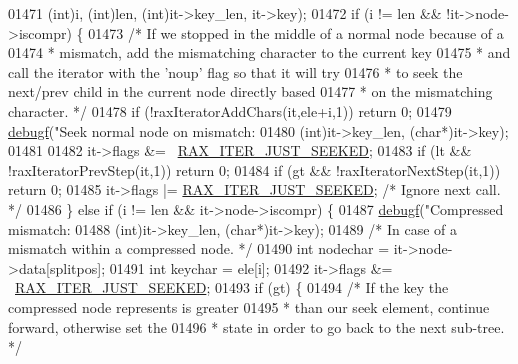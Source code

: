 \begin{DoxyCode}
{{{{{{{{{{{{{{{{{{{{{01471             (\textcolor{keywordtype}{int})i, (\textcolor{keywordtype}{int})len, (\textcolor{keywordtype}{int})it->key\_len, it->key);
01472         \textcolor{keywordflow}{if} (i != len && !it->node->iscompr) \{
01473             \textcolor{comment}{/* If we stopped in the middle of a normal node because of a}
01474 \textcolor{comment}{             * mismatch, add the mismatching character to the current key}
01475 \textcolor{comment}{             * and call the iterator with the 'noup' flag so that it will try}
01476 \textcolor{comment}{             * to seek the next/prev child in the current node directly based}
01477 \textcolor{comment}{             * on the mismatching character. */}
01478             \textcolor{keywordflow}{if} (!raxIteratorAddChars(it,ele+i,1)) \textcolor{keywordflow}{return} 0;
01479             \hyperlink{rax_8c_a10b215c81aa397dbc44adfb3e436befb}{debugf}(\textcolor{stringliteral}{"Seek normal node on mismatch: %
01480                 (\textcolor{keywordtype}{int})it->key\_len, (\textcolor{keywordtype}{char}*)it->key);
01481 
01482             it->flags &= ~\hyperlink{rax_8h_a665a029bbb4c6864ca2153b3ba3b746c}{RAX\_ITER\_JUST\_SEEKED};
01483             \textcolor{keywordflow}{if} (lt && !raxIteratorPrevStep(it,1)) \textcolor{keywordflow}{return} 0;
01484             \textcolor{keywordflow}{if} (gt && !raxIteratorNextStep(it,1)) \textcolor{keywordflow}{return} 0;
01485             it->flags |= \hyperlink{rax_8h_a665a029bbb4c6864ca2153b3ba3b746c}{RAX\_ITER\_JUST\_SEEKED}; \textcolor{comment}{/* Ignore next call. */}
01486         \} \textcolor{keywordflow}{else} \textcolor{keywordflow}{if} (i != len && it->node->iscompr) \{
01487             \hyperlink{rax_8c_a10b215c81aa397dbc44adfb3e436befb}{debugf}(\textcolor{stringliteral}{"Compressed mismatch: %
01488                 (\textcolor{keywordtype}{int})it->key\_len, (\textcolor{keywordtype}{char}*)it->key);
01489             \textcolor{comment}{/* In case of a mismatch within a compressed node. */}
01490             \textcolor{keywordtype}{int} nodechar = it->node->data[splitpos];
01491             \textcolor{keywordtype}{int} keychar = ele[i];
01492             it->flags &= ~\hyperlink{rax_8h_a665a029bbb4c6864ca2153b3ba3b746c}{RAX\_ITER\_JUST\_SEEKED};
01493             \textcolor{keywordflow}{if} (gt) \{
01494                 \textcolor{comment}{/* If the key the compressed node represents is greater}
01495 \textcolor{comment}{                 * than our seek element, continue forward, otherwise set the}
01496 \textcolor{comment}{                 * state in order to go back to the next sub-tree. */}
}}}}}}}}}}}}}}}}}}}}}}}
\end{DoxyCode}
